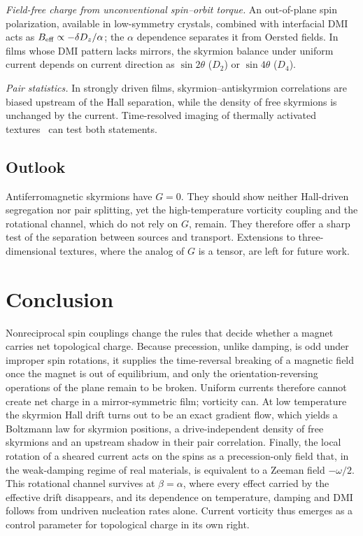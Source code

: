 \documentclass[aps,prb,twocolumn,superscriptaddress,longbibliography,floatfix]{revtex4-2}
\newcommand{\Beff}{B_{\rm eff}}
\begin{document}
\emph{Field-free charge from unconventional spin--orbit torque.} An out-of-plane spin polarization, available in low-symmetry crystals, combined with interfacial DMI acts as $\Beff\propto-\delta D_z/\alpha$; the $\alpha$ dependence separates it from Oersted fields. In films whose DMI pattern lacks mirrors, the skyrmion balance under uniform current depends on current direction as $\sin2\theta$ ($D_2$) or $\sin4\theta$ ($D_4$).

\emph{Pair statistics.} In strongly driven films, skyrmion--antiskyrmion correlations are biased upstream of the Hall separation, while the density of free skyrmions is unchanged by the current. Time-resolved imaging of thermally activated textures~\cite{Zazvorka2019} can test both statements.

\subsection{Outlook}

Antiferromagnetic skyrmions have $G=0$. They should show neither Hall-driven segregation nor pair splitting, yet the high-temperature vorticity coupling and the rotational channel, which do not rely on $G$, remain. They therefore offer a sharp test of the separation between sources and transport. Extensions to three-dimensional textures, where the analog of $G$ is a tensor, are left for future work.

\section{Conclusion}\label{sec:conclusion}

Nonreciprocal spin couplings change the rules that decide whether a magnet carries net topological charge. Because precession, unlike damping, is odd under improper spin rotations, it supplies the time-reversal breaking of a magnetic field once the magnet is out of equilibrium, and only the orientation-reversing operations of the plane remain to be broken. Uniform currents therefore cannot create net charge in a mirror-symmetric film; vorticity can. At low temperature the skyrmion Hall drift turns out to be an exact gradient flow, which yields a Boltzmann law for skyrmion positions, a drive-independent density of free skyrmions and an upstream shadow in their pair correlation. Finally, the local rotation of a sheared current acts on the spins as a precession-only field that, in the weak-damping regime of real materials, is equivalent to a Zeeman field $-\omega/2$. This rotational channel survives at $\beta=\alpha$, where every effect carried by the effective drift disappears, and its dependence on temperature, damping and DMI follows from undriven nucleation rates alone. Current vorticity thus emerges as a control parameter for topological charge in its own right.
\end{document}
